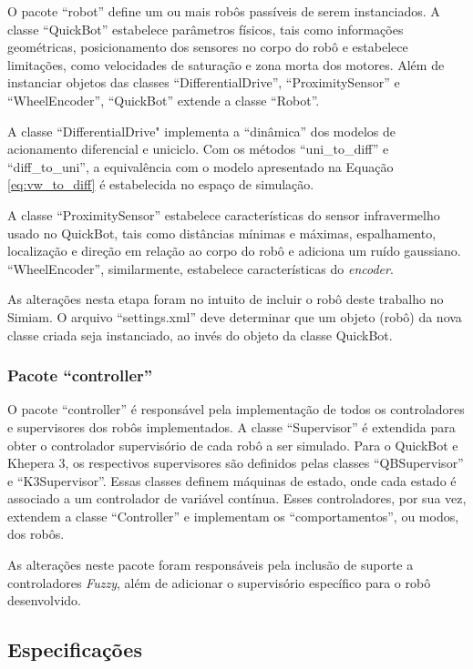 	O pacote ``robot'' define um ou mais robôs passíveis de serem instanciados. A
	classe ``QuickBot'' estabelece parâmetros físicos, tais como informações
	geométricas, posicionamento dos sensores no corpo do robô e estabelece
	limitações, como velocidades de saturação e zona morta dos motores. Além de
	instanciar objetos das classes ``DifferentialDrive'', ``ProximitySensor'' e
	``WheelEncoder'', ``QuickBot'' extende a classe ``Robot''. 
	
	A classe ``DifferentialDrive" implementa a ``dinâmica'' dos modelos de
	acionamento diferencial e uniciclo. Com os métodos ``uni\_to\_diff'' e ``diff\_to\_uni'', a
	equivalência com o modelo apresentado na Equação \ref{eq:vw_to_diff} é
	estabelecida no espaço de simulação. 

	A classe ``ProximitySensor'' estabelece características do sensor infravermelho
	usado no QuickBot, tais como distâncias mínimas e máximas, espalhamento, localização e
	direção em relação ao corpo do robô e adiciona um ruído gaussiano.
	``WheelEncoder'', similarmente, estabelece características do \textit{encoder}.
	
	As alterações nesta etapa foram no intuito de incluir o robô deste trabalho
	no Simiam. O arquivo ``settings.xml'' deve determinar que um objeto (robô) da
	nova classe criada seja instanciado, ao invés do objeto da classe QuickBot.
	
	\subsubsection{Pacote ``controller''}
	
	O pacote ``controller'' é responsável pela implementação de todos os
	controladores e supervisores dos robôs implementados. A classe ``Supervisor'' é
	extendida para obter o controlador supervisório de cada robô a ser simulado.
	Para o QuickBot e Khepera 3, os respectivos supervisores são definidos pelas
	classes ``QBSupervisor'' e ``K3Supervisor''. Essas classes definem máquinas de
	estado, onde cada estado é associado a um controlador de variável contínua.
	Esses controladores, por sua vez, extendem a classe ``Controller'' e
	implementam os ``comportamentos'', ou modos, dos robôs.
	
	As alterações neste pacote foram responsáveis pela inclusão de suporte a
	controladores \textit{Fuzzy}, além de adicionar o supervisório específico para
	o robô desenvolvido.

\subsection{Especificações}

